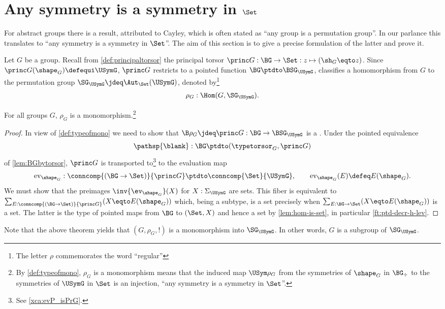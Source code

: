 \section{Any symmetry is a symmetry in $\Set$}
\label{sec:groupssubperm}


For abstract groups there is a result, attributed to Cayley,
which is often stated as ``any group is a permutation group''. 
In our parlance this translates to ``any symmetry is a symmetry in $\Set$''.
The aim of this section is to give a precise formulation of the latter
and prove it.

Let $G$ be a group.
Recall from \cref{def:principaltorsor} the principal torsor
$\princ G:\BG\to\Set: z\mapsto (\sh_G\eqto z)$.
Since $\princ G (\shape_G)\defequi \USymG$, $\princ G$ restricts to
a pointed function $\BG\ptdto \BSG_{\USymG}$, \ie 
classifies a homomorphism from $G$ to the permutation group 
$\SG_{\USymG}\jdeq \Aut_{\Set}(\USymG)$,
denoted by\footnote{The letter $\rho$ commemorates the word ``regular''} 
$$\rho_G:\Hom(G,\SG_{\USymG}).$$

\begin{theorem}[Cayley]
  \label{lem:allgpsarepermutationgps}
  For all groups $G$, $\rho_G$ is a monomorphism.\footnote{By
  \cref{def:typeofmono}, $\rho_G$ is a monomorphism means 
  that the induced map $\USym\rho_G$ from the symmetries of $\shape_G$ in 
  $\BG_\div$ to the symmetries of $\USymG$ in $\Set$ is an injection, 
  \ie ``any symmetry is a symmetry in $\Set$''.}  
\end{theorem}

\begin{proof}
  In view of \cref{def:typeofmono} we need to show that 
  $\B\rho_G\jdeq\princ G :\BG \to \BSG_{\USymG}$ is a \covering.
  Under the pointed equivalence
  $$\pathsp{\blank}:\BG\ptdto (\typetorsor_G,\princ G)$$ of
  \cref{lem:BGbytorsor}, $\princ G$ is transported to\footnote{
  See \cref{xca:evP_isPrG}.} to the
  evaluation map
  $$\mathrm{ev}_{\shape_G}:\conncomp{(\BG\to\Set)}{\princ G}\ptdto
  \conncomp{\Set}{\USymG},\qquad
  \mathrm{ev}_{\shape_G}(E)\defeq E(\shape_G).$$
  We must show that the preimages
  $\inv{\ev_{\shape_G}}(X)$ for $X:\Sigma_{\USymG}$ are sets.  This
  fiber is equivalent to
  $\sum_{E:\conncomp{(\BG\to\Set)}{\princ G}}(X\eqto E(\shape_G))$ which,
  being a subtype, is a
  set precisely when $\sum_{E:\BG\to\Set}(X\eqto E(\shape_G))$ is a set.
  The latter is the type of pointed maps from $\BG$ to $(\Set,X)$
  and hence a set by \cref{lem:hom-is-set}, 
  in particular \cref{ft:ptd-decr-h-lev}.
\end{proof}
  Note that the above theorem yields that 
  $(G,\rho_G,!)$ is a monomorphism into $\SG_{\USymG}$.
  In other words, $G$ is a subgroup of $\SG_{\USymG}$.

